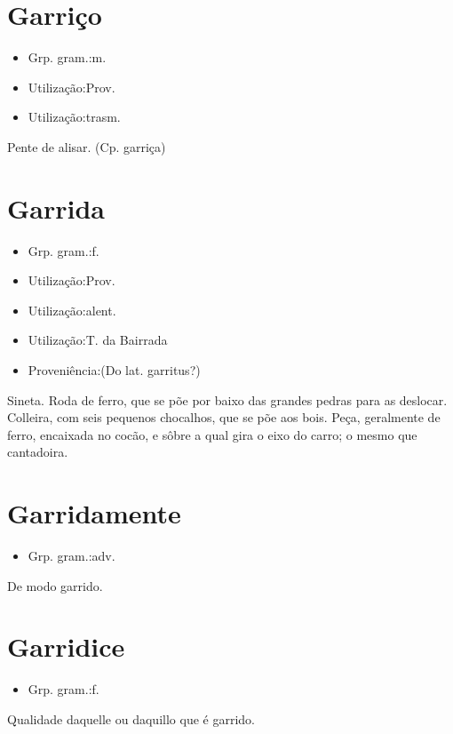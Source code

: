 \section{Garriço}
\begin{itemize}
\item {Grp. gram.:m.}
\end{itemize}
\begin{itemize}
\item {Utilização:Prov.}
\end{itemize}
\begin{itemize}
\item {Utilização:trasm.}
\end{itemize}
Pente de alisar.
(Cp. \textunderscore garriça\textunderscore )
\section{Garrida}
\begin{itemize}
\item {Grp. gram.:f.}
\end{itemize}
\begin{itemize}
\item {Utilização:Prov.}
\end{itemize}
\begin{itemize}
\item {Utilização:alent.}
\end{itemize}
\begin{itemize}
\item {Utilização:T. da Bairrada}
\end{itemize}
\begin{itemize}
\item {Proveniência:(Do lat. \textunderscore garritus\textunderscore ?)}
\end{itemize}
Sineta.
Roda de ferro, que se põe por baixo das grandes pedras para as deslocar.
Colleira, com seis pequenos chocalhos, que se põe aos bois.
Peça, geralmente de ferro, encaixada no cocão, e sôbre a qual gira o eixo do carro; o mesmo que \textunderscore cantadoira\textunderscore .
\section{Garridamente}
\begin{itemize}
\item {Grp. gram.:adv.}
\end{itemize}
De modo garrido.
\section{Garridice}
\begin{itemize}
\item {Grp. gram.:f.}
\end{itemize}
Qualidade daquelle ou daquillo que é garrido.
